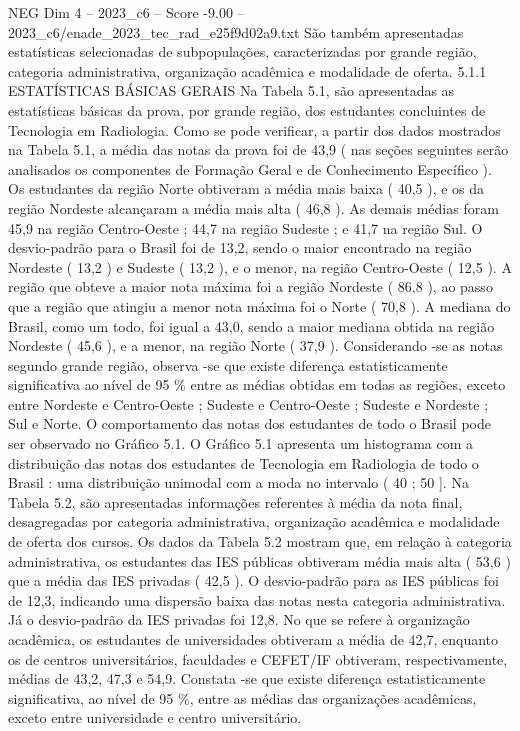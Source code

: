 \begin{textsample}{NEG Dim 4 – 2023\_c6 – Score -9.00 – 2023\_c6/enade\_2023\_tec\_rad\_e25f9d02a9.txt}
São também apresentadas estatísticas selecionadas de subpopulações, caracterizadas por grande região, categoria administrativa, organização acadêmica e modalidade de oferta. 5.1.1 ESTATÍSTICAS BÁSICAS GERAIS Na Tabela 5.1, são apresentadas as estatísticas básicas da prova, por grande região, dos estudantes concluintes de Tecnologia em Radiologia.
Como se pode verificar, a partir dos dados mostrados na Tabela 5.1, a média das notas da prova foi de 43,9 ( nas seções seguintes serão analisados os componentes de Formação Geral e de Conhecimento Específico ).
Os estudantes da região Norte obtiveram a média mais baixa ( 40,5 ), e os da região Nordeste alcançaram a média mais alta ( 46,8 ).
As demais médias foram 45,9 na região Centro-Oeste ; 44,7 na região Sudeste ; e 41,7 na região Sul.
O desvio-padrão para o Brasil foi de 13,2, sendo o maior encontrado na região Nordeste ( 13,2 ) e Sudeste ( 13,2 ), e o menor, na região Centro-Oeste ( 12,5 ).
A região que obteve a maior nota máxima foi a região Nordeste ( 86,8 ), ao passo que a região que atingiu a menor nota máxima foi o Norte ( 70,8 ).
A mediana do Brasil, como um todo, foi igual a 43,0, sendo a maior mediana obtida na região Nordeste ( 45,6 ), e a menor, na região Norte ( 37,9 ).
Considerando -se as notas segundo grande região, observa -se que existe diferença estatisticamente significativa ao nível de 95 \% entre as médias obtidas em todas as regiões, exceto entre Nordeste e Centro-Oeste ; Sudeste e Centro-Oeste ; Sudeste e Nordeste ; Sul e Norte.
O comportamento das notas dos estudantes de todo o Brasil pode ser observado no Gráfico 5.1.
O Gráfico 5.1 apresenta um histograma com a distribuição das notas dos estudantes de Tecnologia em Radiologia de todo o Brasil : uma distribuição unimodal com a moda no intervalo ( 40 ; 50 ].
Na Tabela 5.2, são apresentadas informações referentes à média da nota final, desagregadas por categoria administrativa, organização acadêmica e modalidade de oferta dos cursos.
Os dados da Tabela 5.2 mostram que, em relação à categoria administrativa, os estudantes das IES públicas obtiveram média mais alta ( 53,6 ) que a média das IES privadas ( 42,5 ).
O desvio-padrão para as IES públicas foi de 12,3, indicando uma dispersão baixa das notas nesta categoria administrativa.
Já o desvio-padrão da IES privadas foi 12,8.
No que se refere à organização acadêmica, os estudantes de universidades obtiveram a média de 42,7, enquanto os de centros universitários, faculdades e CEFET/IF obtiveram, respectivamente, médias de 43,2, 47,3 e 54,9.
Constata -se que existe diferença estatisticamente significativa, ao nível de 95 \%, entre as médias das organizações acadêmicas, exceto entre universidade e centro universitário.

\end{textsample}
